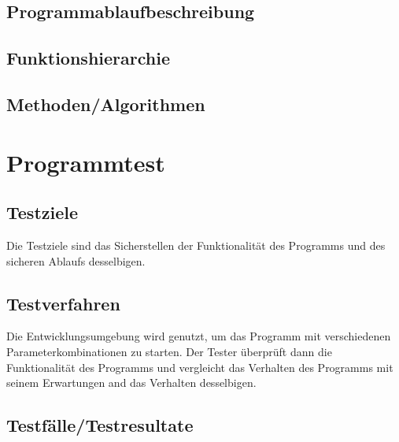 \documentclass[11pt]{article}
\begin{document}
  \subsection{Programmablaufbeschreibung} 
  \subsection{Funktionshierarchie}
  \subsection{Methoden/Algorithmen}
  
   \section{Programmtest}
  \subsection{Testziele}
  Die Testziele sind das Sicherstellen der Funktionalität des Programms und des sicheren Ablaufs desselbigen.
  
  \subsection{Testverfahren}
Die Entwicklungsumgebung wird genutzt, um das Programm mit verschiedenen Parameterkombinationen zu starten. Der Tester überprüft dann die Funktionalität des Programms und vergleicht das Verhalten des Programms mit seinem Erwartungen and das Verhalten desselbigen.
  \subsection{Testfälle/Testresultate}
\end{document}
